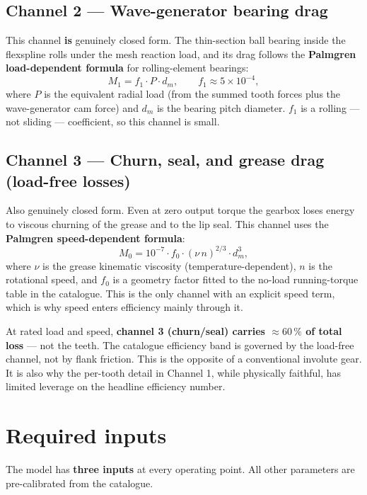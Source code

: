 \documentclass[11pt,a4paper]{article}
\begin{document}
\subsection{Channel 2 — Wave-generator bearing drag}

This channel \textbf{is} genuinely closed form.  The thin-section ball
bearing inside the flexspline rolls under the mesh reaction load, and its
drag follows the \textbf{Palmgren load-dependent formula} for
rolling-element bearings:
\[
  M_1 = f_1 \cdot P \cdot d_m, \qquad f_1 \approx 5\times10^{-4},
\]
where \(P\) is the equivalent radial load (from the summed tooth forces
plus the wave-generator cam force) and \(d_m\) is the bearing pitch
diameter.  \(f_1\) is a rolling — not sliding — coefficient, so this
channel is small.

\subsection{Channel 3 — Churn, seal, and grease drag (load-free losses)}

Also genuinely closed form.  Even at zero output torque the gearbox loses
energy to viscous churning of the grease and to the lip seal.  This
channel uses the \textbf{Palmgren speed-dependent formula}:
\[
  M_0 = 10^{-7} \cdot f_0 \cdot (\nu\, n)^{2/3} \cdot d_m^3,
\]
where \(\nu\) is the grease kinematic viscosity (temperature-dependent),
\(n\) is the rotational speed, and \(f_0\) is a geometry factor fitted to
the no-load running-torque table in the catalogue.  This is the only
channel with an explicit speed term, which is why speed enters efficiency
mainly through it.

\begin{watchout}
At rated load and speed, \textbf{channel 3 (churn/seal) carries
\(\approx 60\,\%\) of total loss} — not the teeth.
The catalogue efficiency band is governed by the load-free channel,
not by flank friction.  This is the opposite of a conventional involute gear.
It is also why the per-tooth detail in Channel 1, while physically
faithful, has limited leverage on the headline efficiency number.
\end{watchout}

\section{Required inputs}

The model has \textbf{three inputs} at every operating point.
All other parameters are pre-calibrated from the catalogue.
\end{document}
